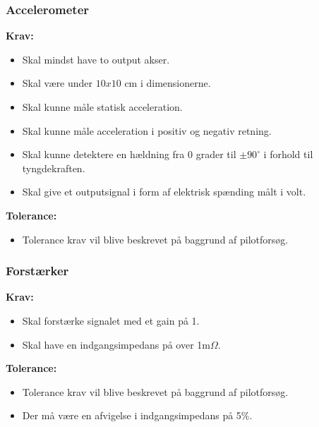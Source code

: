 \subsubsection{Accelerometer}
\textbf{Krav:}
\begin{itemize}
\item Skal mindst have to output akser.
\item Skal være under $10x10$ cm i dimensionerne.
\item Skal kunne måle statisk acceleration.
\item Skal kunne måle acceleration i positiv og negativ retning.
\item Skal kunne detektere en hældning fra 0 grader til $\pm 90^{\circ}$ i forhold til tyngdekraften.
\item Skal give et outputsignal  i form af elektrisk spænding målt i volt.
\end{itemize}
\textbf{Tolerance:}
\begin{itemize}
\item Tolerance krav vil blive beskrevet på baggrund af pilotforsøg.
\end{itemize}
\subsubsection{Forstærker}
\textbf{Krav:}
\begin{itemize}
\item Skal forstærke signalet med et gain på 1.
\item Skal have en indgangsimpedans på over 1m$\Omega$.
\end{itemize}
\textbf{Tolerance:}
\begin{itemize}
\item Tolerance krav vil blive beskrevet på baggrund af pilotforsøg.
\item Der må være en afvigelse i indgangsimpedans på 5\%.
\end{itemize}
